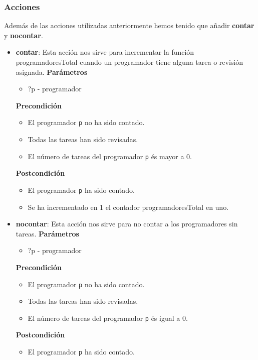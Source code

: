 \documentclass[11pt]{article}
\begin{document}
\subsubsection{Acciones}
Además de las acciones utilizadas anteriormente hemos tenido que añadir \textbf{contar} y \textbf{nocontar}.
\begin{itemize}
	\item \textbf{contar}: Esta acción nos sirve para incrementar la función programadoresTotal cuando un programador tiene alguna tarea o revisión asignada. 
	\textbf{Parámetros}
	\begin{itemize}
		\item ?p - programador
	\end{itemize}
	\textbf{Precondición}
	\begin{itemize}
		\item El programador \texttt{p} no ha sido contado.
		\item Todas las tareas han sido revisadas.
		\item El número de tareas del programador \texttt{p} és mayor a 0. 
	\end{itemize}
	\textbf{Postcondición}
	\begin{itemize}	
		\item El programador \texttt{p} ha sido contado.
		\item Se ha incrementado en 1 el contador programadoresTotal en uno.
	\end{itemize}

	\item \textbf{nocontar}: Esta acción nos sirve para no contar a los programadores sin tareas. 
	\textbf{Parámetros}
	\begin{itemize}
		\item ?p - programador
	\end{itemize}
	\textbf{Precondición}
	\begin{itemize}
		\item El programador \texttt{p} no ha sido contado.
		\item Todas las tareas han sido revisadas.
		\item El número de tareas del programador \texttt{p} és igual a 0. 
	\end{itemize}
	\textbf{Postcondición}
	\begin{itemize}	
		\item El programador \texttt{p} ha sido contado.
	\end{itemize}
	
\end{itemize}
\end{document}
